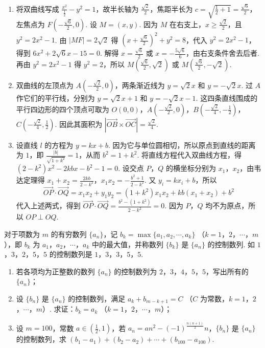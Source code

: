\begin{solution}
\begin{enumerate}
\item 将双曲线写成 \(\frac{x^2}{\frac{1}{2}}-y^2=1\)，故半长轴为 \(\frac{\sqrt2}{2}\)，焦距半长为 \(c=\sqrt{\frac12+1}=\frac{\sqrt6}{2}\)，左焦点为 \(F\left(-\frac{\sqrt6}{2},0\right)\). 设 \(M=(x,y)\). 因为 \(M\) 在右支上，\(x\geqslant\frac{\sqrt2}{2}\)，且 \(y^2=2x^2-1\). 由 \(|MF|=2\sqrt2\) 得 \(\left(x+\frac{\sqrt6}{2}\right)^2+y^2=8\)，代入 \(y^2=2x^2-1\)，得到 \(6x^2+2\sqrt6x-15=0\). 解得 \(x=\frac{\sqrt6}{2}\) 或 \(x=-\frac{5\sqrt6}{6}\)，由右支条件舍去后者. 再由 \(y^2=2x^2-1\) 得 \(y^2=2\)，所以 \(M\left(\frac{\sqrt6}{2},\sqrt2\right)\) 或 \(M\left(\frac{\sqrt6}{2},-\sqrt2\right)\).
\item 双曲线的左顶点为 \(A\left(-\frac{\sqrt2}{2},0\right)\)，两条渐近线为 \(y=\sqrt2x\) 和 \(y=-\sqrt2x\). 过 \(A\) 作它们的平行线，分别为 \(y=\sqrt2x+1\) 和 \(y=-\sqrt2x-1\). 这四条直线围成的平行四边形的四个顶点可取为 \(O(0,0)\)，\(A\left(-\frac{\sqrt2}{2},0\right)\)，\(B\left(-\frac{\sqrt2}{4},-\frac12\right)\)，\(C\left(-\frac{\sqrt2}{4},\frac12\right)\). 因此其面积为 \(\left|\overrightarrow{OB}\times\overrightarrow{OC}\right|=\frac{\sqrt2}{4}\).
\item 设直线 \(l\) 的方程为 \(y=kx+b\). 因为它与单位圆相切，所以原点到直线的距离为 \(1\)，即 \(\frac{|b|}{\sqrt{1+k^2}}=1\)，从而 \(b^2=1+k^2\). 将直线方程代入双曲线方程，得 \((2-k^2)x^2-2kbx-b^2-1=0\). 设交点 \(P\)，\(Q\) 的横坐标分别为 \(x_1\)，\(x_2\)，由韦达定理得 \(x_1+x_2=\frac{2kb}{2-k^2}\)，\(x_1x_2=-\frac{b^2+1}{2-k^2}\). 又 \(y_i=kx_i+b\)，所以
\[
\overrightarrow{OP}\cdot\overrightarrow{OQ}=x_1x_2+y_1y_2=(1+k^2)x_1x_2+kb(x_1+x_2)+b^2
\]
代入上述两式，得到 \(\overrightarrow{OP}\cdot\overrightarrow{OQ}=\frac{b^2-(1+k^2)}{2-k^2}=0\). 因为 \(P\)，\(Q\) 均不为原点，所以 \(OP\perp OQ\).
\end{enumerate}
\end{solution}

\begin{problem}
对于项数为 \(m\) 的有穷数列 \(\{a_{n}\}\)，记 \(b_{k} = \max \{a_{1}, a_{2}, \cdots , a_{k}\}\) （\(k = 1\)，\(2\)，\(\cdots\)，\(m\)），即 \(b_{k}\) 为 \(a_{1}\)，\(a_{2}\)，\(\cdots\)，\(a_{k}\) 中的最大值，并称数列 \(\{b_{k}\}\) 是 \(\{a_{n}\}\) 的控制数列. 如 \(1\)，\(3\)，\(2\)，\(5\)，\(5\) 的控制数列是 \(1\)，\(3\)，\(3\)，\(5\)，\(5\).
\begin{enumerate}
\item 若各项均为正整数的数列 \(\{a_{n}\}\) 的控制数列为 \(2\)，\(3\)，\(4\)，\(5\)，\(5\)，写出所有的 \(\{a_{n}\}\)；
\item 设 \(\{b_{n}\}\) 是 \(\{a_{n}\}\) 的控制数列，满足 \(a_{k} + b_{m - k + 1} = C\) （\(C\) 为常数，\(k = 1\)，\(2\)，\(\cdots\)，\(m\)）. 求证：\(b_{k} = a_{k}\) （\(k = 1\)，\(2\)，\(\cdots\)，\(m\)）；
\item 设 \(m = 100\)，常数 \(a \in \left(\frac{1}{2}, 1\right)\)，若 \(a_{n} = a n^{2} - (-1)^{\frac{n(n + 1)}{2}} n\)，\(\{b_{n}\}\) 是 \(\{a_{n}\}\) 的控制数列，求 \((b_{1} - a_{1}) + (b_{2} - a_{2}) + \cdots + (b_{100} - a_{100})\).
\end{enumerate}
\end{problem}

